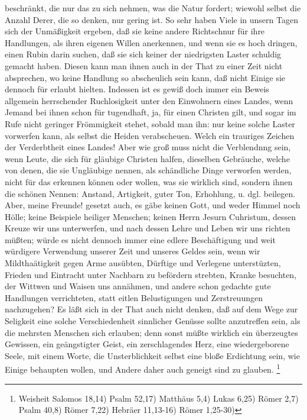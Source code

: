 beschränkt, die nur das zu sich nehmen, was die Natur fordert; wiewohl selbst
die Anzahl Derer, die so denken, nur gering ist. So sehr haben Viele in unsern
Tagen sich der Unmäßigkeit ergeben, daß sie keine andere Richtschnur für ihre
Handlungen, als ihren eigenen Willen anerkennen, und wenn sie es hoch dringen,
einen Rubin darin suchen, daß sie sich keiner der niedrigsten Laster schuldig
gemacht haben. Diesen kann man ihnen auch in der That zu einer Zeit nicht
absprechen, wo keine Handlung so abscheulich sein kann, daß nicht Einige sie
dennoch für erlaubt hielten. Indessen ist es gewiß doch immer ein Beweis
allgemein herrschender Ruchlosigkeit unter den Einwohnern eines Landes, wenn
Jemand bei ihnen schon für tugendhaft, ja, für einen Christen gilt, und sogar im
Rufe nicht geringer Frömmigkeit stehet, sobald man ihn: nur keine solche Laster
vorwerfen kann, als selbst die Heiden verabscheuen. Welch ein trauriges Zeichen
der Verderbtheit eines Landes! Aber wie groß muss nicht die Verblendnng sein,
wenn Leute, die sich für gläubige Christen halfen, dieselben Gebräuche, welche
von denen, die sie Ungläubige nennen, als schändliche Dinge verworfen werden,
nicht für das erkennen können oder wollen, was sie wirklich sind, sondern ihnen
die schönen Nennen: Anstand, Artigkeit, guter Ton, Erhohlung, u. dgl. beilegen.
Aber, meine Freunde! gesetzt auch, es gäbe keinen Gott, und weder Himmel noch
Hölle; keine Beispiele heiliger Menschen; keinen Herrn Jesurn Cuhristum, dessen
Kreuze wir uns unterwerfen, und nach dessen Lehre und Leben wir uns richten
müßten; würde es nicht dennoch immer eine edlere Beschäftigung und weit
würdigere Verwendung unserer Zeit und unseres Geldes sein, wenn wir
Mildthaätigkeit gegen Arme ausübten, Dürftige und Verlegene unterstüzten,
Frieden und Eintracht unter Nachbarn zu befördern strebten, Kranke besuchten,
der Wittwen und Waisen uns annähmen, und andere schon gedachte gute Handlungen
verrichteten, statt eitlen Belustigungen und Zerstreuungen nachzugehen? Es läßt
sich in der That auch nicht denken, daß auf dem Wege zur Seligkeit eine solche
Verschiedenheit sinnlicher Genüsse sollte anzutreffen sein, als die mehrsten
Menschen sich erlauben; denn sonst müßte wirklich ein überzeugtes Gewissen, ein
geängstigter Geist, ein zerschlagendes Herz, eine wiedergeborene Seele, mit
einem Worte, die Unsterblichkeit selbst eine bloße Erdichtung sein, wie Einige
behaupten wollen, und Andere daher auch geneigt sind zu glauben.
\footnote{Weisheit Salomos 18,14)
Psalm 52,17)
Matthäus 5,4)
Lukas 6,25)
Römer 2,7)
Psalm 40,8)
Römer 7,22)
Hebräer 11,13-16)
Römer 1,25-30)}
